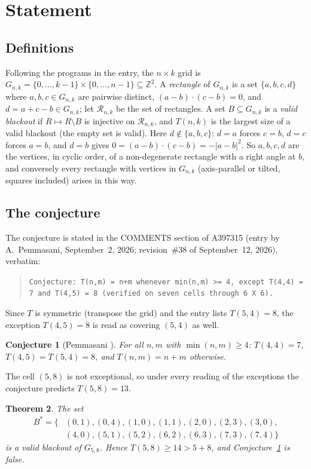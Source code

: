 \documentclass[11pt]{amsart}
\theoremstyle{plain}
\newtheorem{theorem}{Theorem}
\newtheorem{conjecture}[theorem]{Conjecture}
\theoremstyle{definition}
\newcommand{\Z}{\mathbb{Z}}
\newcommand{\G}{G_{n,k}}
\newcommand{\Rc}{\mathcal{R}}
\newcommand{\Bs}{B^{*}}
\begin{document}
\section{Statement}\label{sec:statement}

\subsection*{Definitions}
Following the programs in the entry, the $n\times k$ grid is $\G=\{0,\dots,k-1\}\times\{0,\dots,n-1\}\subseteq\Z^2$. A \emph{rectangle} of $\G$ is a set $\{a,b,c,d\}$ where $a,b,c\in\G$ are pairwise distinct, $(a-b)\cdot(c-b)=0$, and $d=a+c-b\in\G$; let $\Rc_{n,k}$ be the set of rectangles. A set $B\subseteq\G$ is a \emph{valid blackout} if $R\mapsto R\setminus B$ is injective on $\Rc_{n,k}$, and $T(n,k)$ is the largest size of a valid blackout (the empty set is valid).
Here $d\notin\{a,b,c\}$: $d=a$ forces $c=b$, $d=c$ forces $a=b$, and $d=b$ gives $0=(a-b)\cdot(c-b)=-|a-b|^2$. So $a,b,c,d$ are the vertices, in cyclic order, of a non-degenerate rectangle with a right angle at $b$, and conversely every rectangle with vertices in $\G$ (axis-parallel or tilted, squares included) arises in this way.

\subsection*{The conjecture}
The conjecture is stated in the COMMENTS section of A397315 (entry by A.~Pemmasani, September~2, 2026; revision~\#38 of September~12, 2026), verbatim:
\begin{quote}
\texttt{Conjecture: T(n,m) = n+m whenever min(n,m) >= 4, except T(4,4) = 7 and T(4,5) = 8 (verified on seven cells through 6 X 6).}
\end{quote}
Since $T$ is symmetric (transpose the grid) and the entry lists $T(5,4)=8$, the exception $T(4,5)=8$ is read as covering $(5,4)$ as well.

\begin{conjecture}[Pemmasani \cite{A397315}]\label{conj}
For all $n,m$ with $\min(n,m)\ge4$: $T(4,4)=7$, $T(4,5)=T(5,4)=8$, and $T(n,m)=n+m$ otherwise.
\end{conjecture}

The cell $(5,8)$ is not exceptional, so under every reading of the exceptions the conjecture predicts $T(5,8)=13$.

\begin{theorem}\label{thm:main}
The set
\begin{align*}
  \Bs=\{&(0,1),(0,4),(1,0),(1,1),(2,0),(2,3),(3,0),\\
  &(4,0),(5,1),(5,2),(6,2),(6,3),(7,3),(7,4)\}
\end{align*}
is a valid blackout of $G_{5,8}$. Hence $T(5,8)\ge14>5+8$, and Conjecture~\ref{conj} is false.
\end{theorem}
\end{document}
